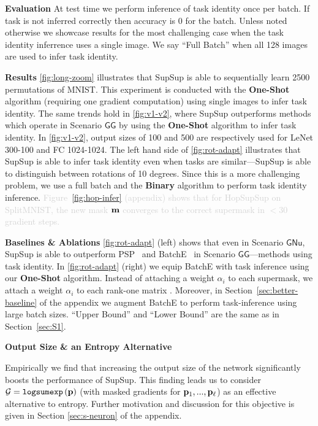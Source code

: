 \documentclass{article}
\newcommand{\ac}{SupSup\xspace}
\newcommand{\comments}[1]{#1}
\newcommand{\comments}[1]{}
\newcommand{\removed}[1]{\comments{\textcolor{lightgray}{#1}}}
\newcommand{\casename}[1]{\ensuremath{\mathsf{#1}}\xspace}
\begin{document}
\textbf{Evaluation } At test time we perform inference of task identity once per batch. If task is not inferred correctly then accuracy is 0 for the batch. Unless noted otherwise we showcase results for the most challenging case when the task identity inferrence uses a single image. We say ``Full Batch'' when all 128 images are used to infer task identity.

\textbf{Results } \autoref{fig:long-zoom} illustrates that \ac is able to sequentially learn 2500 permutations of MNIST. This experiment is conducted with the \textbf{One-Shot} algorithm (requiring one gradient computation) using single images to infer task identity. The same trends hold in \autoref{fig:v1-v2}, where \ac outperforms methods which operate in Scenario \casename{GG} by using the \textbf{One-Shot} algorithm to infer task identity. In \autoref{fig:v1-v2}, output sizes of 100 and 500 are respectively used for LeNet 300-100 and FC 1024-1024. The left hand side of \autoref{fig:rot-adapt} illustrates that \ac is able to infer task identity even when tasks are similar---\ac is able to distinguish between rotations of 10 degrees. Since this is a more challenging problem, we use a full batch and the \textbf{Binary} algorithm to perform task identity inference. \removed{Figure~\ref{fig:hop-infer} (appendix) shows that for HopSupSup on SplitMNIST, the new mask $\mathbf{m}$ converges to the correct supermask in $<30$ gradient steps.}

\textbf{Baselines \& Ablations} \autoref{fig:rot-adapt} (left) shows that even in Scenario \casename{GNu}, \ac is able to outperform PSP~\cite{cheung2019superposition} and BatchE~\cite{wen2020batchensemble} in Scenario \casename{GG}---methods using task identity. 
In \autoref{fig:rot-adapt} (right) we equip BatchE with task inference using our \textbf{One-Shot} algorithm. Instead of attaching a weight $\alpha_i$ to each supermask, we attach a weight $\alpha_i$ to each rank-one matrix \cite{wen2020batchensemble}. Moreover, in Section~\ref{sec:better-baseline} of the appendix we augment BatchE to perform task-inference using large batch sizes.
``Upper Bound'' and ``Lower Bound'' are the same as in Section~\ref{sec:S1}.

\textbf{Output Size \& an Entropy Alternative}

Empirically we find that increasing the  output size of the network significantly boosts the performance of \ac. This finding leads us to consider $\mathcal{G} = \texttt{logsumexp}\left( \mathbf{p} \right)$ (with masked gradients for $\mathbf{p}_1,...,\mathbf{p}_\ell$) as an effective alternative to entropy. Further motivation and discussion for this objective is given in Section \ref{sec:s-neuron} of the appendix.
\end{document}
